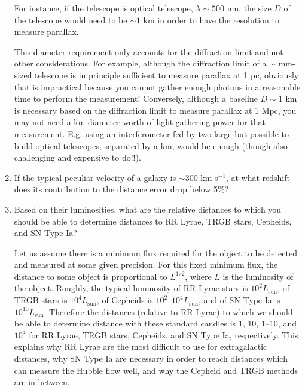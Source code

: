 \begin{enumerate}
\begin{answer}
For instance, if the telescope is optical telescope, $\lambda \sim
500$ nm, the size $D$ of the telescope would need to be $\sim 1$ km in
order to have the resolution to measure parallax.

This diameter requirement only accounts for the diffraction limit and
not other considerations. For example, although the diffraction limit
of a $\sim$ mm-sized telescope is in principle sufficient to measure
parallax at 1 pc, obviously that is impractical because you cannot
gather enough photons in a reasonable time to perform the measurement!
Conversely, although a baseline $D\sim 1$ km is necessary based on the
diffraction limit to measure parallax at 1 Mpc, you may not need a
km-diameter worth of light-gathering power for that measurement.
E.g. using an interferometer fed by two large but possible-to-build
optical telescopes, separated by a km, would be enough (though also
challenging and expensive to do!!).
\end{answer}

\item If the typical peculiar velocity of a galaxy is $\sim 300$ km
    s$^{-1}$, at what redshift does its contribution to the distance
   error drop below 5\%?
\item Based on their luminosities, what are the relative distances to
   which you should be able to determine distances to RR Lyrae,
   TRGB stars, Cepheids, and SN Type Ia?

\begin{answer}
Let us assume there is a minimum flux required for the object to be
detected and measured at some given precision. For this fixed minimum
flux, the distance to some object is proportional to $L^{1/2}$, where
$L$ is the luminosity of the object. Roughly, the typical luminosity
of RR Lyrae stars is $10^2 L_\text{sun}$, of TRGB stars is $10^4
L_\text{sun}$, of Cepheids is $10^2$--$10^4 L_\text{sun}$, and of SN
Type Ia is $10^{10}L_\text{sun}$. Therefore the distances (relative to
RR Lyrae) to which we should be able to determine distance with these
standard candles is 1, 10, 1--10, and $10^4$ for RR Lyrae, TRGB stars,
Cepheids, and SN Type Ia, respectively. This explains why RR Lyrae are
the most difficult to use for extragalactic distances, why SN Type Ia
are necessary in order to reach distances which can measure the Hubble
flow well, and why the Cepheid and TRGB methods are in between. 
\end{answer}

\end{enumerate} 

